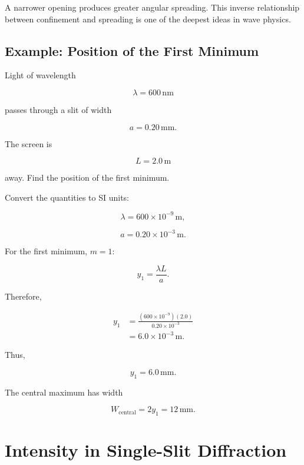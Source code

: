 \documentclass{studentnotes}
\begin{document}
\begin{importantnote}
    A narrower opening produces greater angular spreading. This inverse relationship between confinement and spreading is one of the deepest ideas in wave physics.
\end{importantnote}

\subsection{Example: Position of the First Minimum}

\begin{example}
    Light of wavelength

    \[
        \lambda=600\,\text{nm}
    \]

    passes through a slit of width

    \[
        a=0.20\,\text{mm}.
    \]

    The screen is

    \[
        L=2.0\,\text{m}
    \]

    away. Find the position of the first minimum.
\end{example}

Convert the quantities to SI units:

\[
    \lambda=600\times10^{-9}\,\text{m},
\]

\[
    a=0.20\times10^{-3}\,\text{m}.
\]

For the first minimum, \(m=1\):

\[
    y_1=\frac{\lambda L}{a}.
\]

Therefore,

\[
    \begin{aligned}
        y_1
         & =
        \frac{(600\times10^{-9})(2.0)}
        {0.20\times10^{-3}} \\
         & =
        6.0\times10^{-3}\,\text{m}.
    \end{aligned}
\]

Thus,

\[
    \boxed{y_1=6.0\,\text{mm}.}
\]

The central maximum has width

\[
    W_{\text{central}}=2y_1=12\,\text{mm}.
\]

\section{Intensity in Single-Slit Diffraction}
\end{document}
